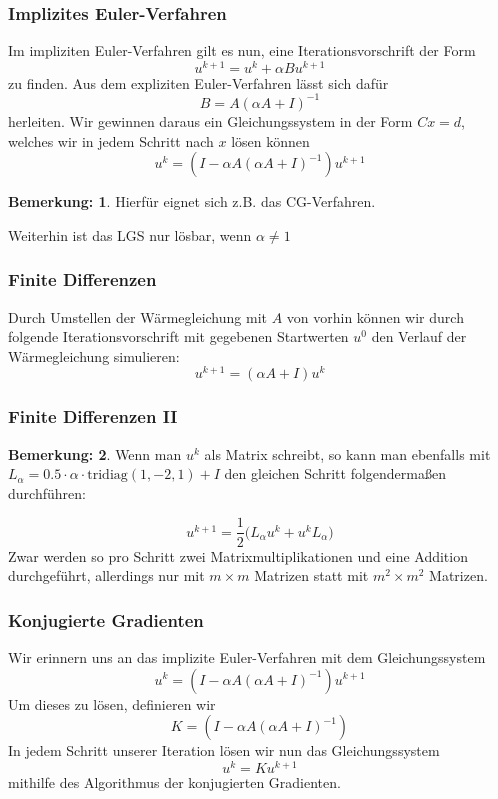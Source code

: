 \documentclass[xcolor = dvipsnames, notheorems, 10pt]{beamer}
\newcommand{\vth}{\vspace{4pt}}
\theoremstyle{definition}
\newtheorem{remark}		{Bemerkung:\vth}
\begin{document}
\begin{frame}
\frametitle{Implizites Euler-Verfahren}
	Im impliziten Euler-Verfahren gilt es nun, eine Iterationsvorschrift der Form
	$$ u^{k+1} = u^k + \alpha Bu^{k+1} $$
	zu finden.
	Aus dem expliziten Euler-Verfahren lässt sich dafür
	$$ B = A (\alpha A + I)^{-1} $$
	herleiten.
	Wir gewinnen daraus ein Gleichungssystem in der Form $Cx = d$, welches wir in jedem Schritt nach $x$ lösen können
	$$ u^k = (I - \alpha A (\alpha A + I)^{-1}) u^{k+1} $$
	\begin{remark}
		Hierfür eignet sich z.B. das CG-Verfahren.

		Weiterhin ist das LGS nur lösbar, wenn $\alpha \neq 1$
	\end{remark}

\end{frame}

\begin{frame}
\frametitle{Finite Differenzen}
	Durch Umstellen der Wärmegleichung mit $A$ von vorhin können wir durch folgende Iterationsvorschrift mit gegebenen Startwerten $u^0$ den Verlauf der Wärmegleichung simulieren:
	$$u^{k+1} = (\alpha A+I)u^k$$
\end{frame}

\begin{frame}
\frametitle{Finite Differenzen II}
	\begin{remark}
		Wenn man $u^k$ als Matrix schreibt, so kann man ebenfalls mit $L_\alpha = 0.5 \cdot \alpha \cdot \text{tridiag}(1,-2,1) + I$ den gleichen Schritt folgendermaßen durchführen:

		$$u^{k+1} = \frac{1}{2} \big( L_\alpha u^k + u^kL_\alpha \big)$$
		Zwar werden so pro Schritt zwei Matrixmultiplikationen und eine Addition durchgeführt, allerdings nur mit $m \times m$ Matrizen statt mit $m^2 \times m^2$ Matrizen.
	\end{remark}
\end{frame}


\begin{frame}
\frametitle{Konjugierte Gradienten}
	Wir erinnern uns an das implizite Euler-Verfahren mit dem Gleichungssystem 
		$$ u^k = (I - \alpha A (\alpha A + I)^{-1}) u^{k+1} $$
	Um dieses zu lösen, definieren wir 
		$$ K = (I - \alpha A (\alpha A + I)^{-1})$$
	In jedem Schritt unserer Iteration lösen wir nun das Gleichungssystem
		$$ u^k = Ku^{k+1}$$
	mithilfe des Algorithmus der konjugierten Gradienten.

\end{frame}
\end{document}
